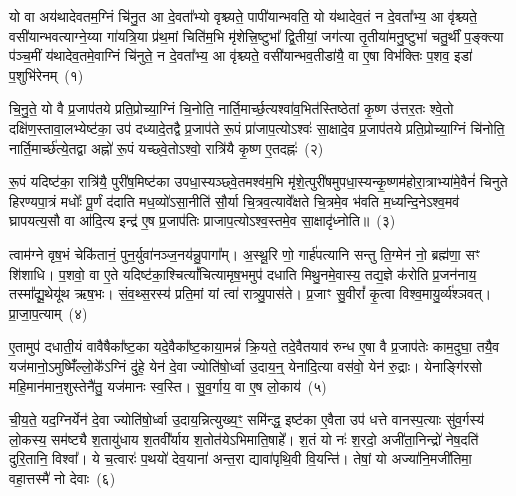 \setcounter{anuvakam}{0}
यो वा अय॑थादेवतम॒ग्निं चि॑नु॒त आ दे॒वता᳚भ्यो वृश्च्यते॒ पापी॑यान्भवति॒ यो य॑थादेव॒तं न दे॒वता᳚भ्य॒ आ वृ॑श्च्यते॒ वसी॑यान्भवत्याग्ने॒य्या गा॑यत्रि॒या प्र॑थ॒मां चिति॑म॒भि मृ॑शेत्त्रि॒ष्टुभा᳚ द्वि॒तीयां॒ जग॑त्या तृ॒तीया॑मनु॒ष्टुभा॑ चतु॒र्थीं प॒ङ्क्त्या प॑ञ्च॒मीं य॑थादेव॒तमे॒वाग्निं चि॑नुते॒ न दे॒वता᳚भ्य॒ आ वृ॑श्च्यते॒ वसी॑यान्भव॒तीडा॑यै॒ वा ए॒षा विभ॑क्तिः प॒शव॒ इडा॑ प॒शुभि॑रेनम्~(१)

चि॒नु॒ते॒ यो वै प्र॒जा\-प॑तये प्रति॒प्रोच्या॒ग्निं चि॒नोति॒ नार्ति॒मार्च्छ॒त्यश्वा॑व॒भित॑स्तिष्ठेतां कृ॒ष्ण उ॑त्तर॒तः श्वे॒तो दक्षि॑ण॒\-स्तावा॒लभ्येष्ट॑का॒ उप॑ दध्यादे॒तद्वै प्र॒जा\-प॑ते रू॒पं प्रा॑जाप॒त्यो\-ऽश्वः॑ सा॒क्षादे॒व प्र॒जा\-प॑तये प्रति॒प्रोच्या॒ग्निं चि॑नोति॒ नार्ति॒मार्च्छ॑त्ये॒तद्वा अह्नो॑ रू॒पं यच्छ्वे॒तो\-ऽश्वो॒ रात्रि॑यै कृ॒ष्ण ए॒तदह्नः॑~(२)

रू॒पं यदिष्ट॑का॒ रात्रि॑यै॒ पुरी॑ष॒मिष्ट॑का उपधा॒स्यञ्छ्वे॒तमश्व॑म॒भि मृ॑शे॒त्पुरी॑षमुपधा॒स्यन्कृ॒ष्णम॑होरा॒त्राभ्या॑मे॒वैनं॑ चिनुते हिरण्यपा॒त्रं मधोः᳚ पू॒र्णं द॑दाति मध॒व्यो॑\-ऽसा॒नीति॑ सौ॒र्या चि॒त्रव॒त्यावे᳚क्षते चि॒त्रमे॒व भ॑वति म॒ध्यन्दि॒ने\-ऽश्व॒मव॑ घ्रापयत्य॒सौ वा आ॑दि॒त्य इन्द्र॑ ए॒ष प्र॒जा\-प॑तिः प्राजाप॒त्यो\-ऽश्व॒स्तमे॒व सा॒क्षादृ॑ध्नोति॥~(३)

{}%

त्वाम॑ग्ने वृष॒भं चेकि॑तानं॒ पुन॒र्युवा॑नञ्ज॒नय॑न्नु॒पागा᳚म्। अ॒स्थू॒रि णो॒ गार्\mbox{}ह॑पत्यानि सन्तु ति॒ग्मेन॑ नो॒ ब्रह्म॑णा॒ सꣳ शि॑शाधि। प॒शवो॒ वा ए॒ते यदिष्ट॑का॒श्चित्यां᳚चित्यामृष॒भमुप॑ दधाति मिथु॒नमे॒वास्य॒ तद्य॒ज्ञे क॑रोति प्र॒जन॑नाय॒ तस्मा᳚द्यू॒थेयू॑थ ऋष॒भः। सं॒व॒थ्स॒रस्य॑ प्रति॒मां यां त्वा॑ रात्र्यु॒पास॑ते। प्र॒जाꣳ सु॒वीरां᳚ कृ॒त्वा विश्व॒मायु॒र्व्य॑श्ञवत्। प्रा॒जा॒प॒त्याम्~(४)

ए॒तामुप॑ दधाती॒यं वावैषैका᳚ष्ट॒का यदे॒वैका᳚ष्ट॒काया॒मन्नं॑ क्रि॒यते॒ तदे॒वैतयाव॑ रुन्ध ए॒षा वै प्र॒जा\-प॑तेः काम॒दुघा॒ तयै॒व यज॑मानो॒\-ऽमुष्मिँ॑ल्लो॒के᳚\-ऽग्निं दु॑हे॒ येन॑ दे॒वा ज्योति॑षो॒र्ध्वा उ॒दाय॒न्॒ येना॑दि॒त्या वस॑वो॒ येन॑ रु॒द्राः। येनाङ्गि॑रसो महि॒मान॑मान॒शुस्तेनै॑तु॒ यज॑मानः स्व॒स्ति। सु॒व॒र्गाय॒ वा ए॒ष लो॒काय॑~(५)

ची॒य॒ते॒ यद॒ग्निर्येन॑ दे॒वा ज्योति॑षो॒र्ध्वा उ॒दाय॒न्नित्युख्य॒ꣳ॒ समि॑न्द्ध॒ इष्ट॑का ए॒वैता उप॑ धत्ते वानस्प॒त्याः सु॑व॒र्गस्य॑ लो॒कस्य॒ सम॑ष्ट्यै श॒तायु॑धाय श॒तवी᳚र्याय श॒तोत॑ये\-ऽभिमाति॒षाहे᳚। श॒तं यो नः॑ श॒रदो॒ अजी॑ता॒निन्द्रो॑ नेष॒दति॑ दुरि॒तानि॒ विश्वा᳚। ये च॒त्वारः॑ प॒थयो॑ देव॒याना॑ अन्त॒रा द्यावा॑पृथि॒वी वि॒यन्ति॑। तेषां॒ यो अज्या॑नि॒मजी॑तिमा॒ वहा॒त्तस्मै॑ नो देवाः~(६)

